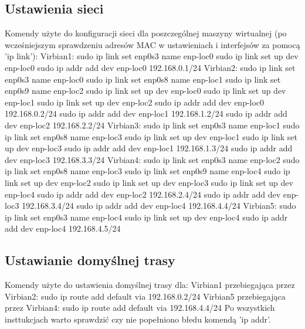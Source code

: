 \documentclass{article}
\begin{document}
\subsection{Ustawienia sieci}
Komendy użyte do konfiguracji sieci dla poszczególnej maszyny wirtualnej (po wcześniejszym sprawdzeniu adresów MAC w ustawieniach i interfejsów za pomocą 'ip link'):
\tabto{0.4cm}Virbian1:
\tabto{0.8cm}    sudo ip link set enp0s3 name enp-loc0
\tabto{0.8cm}    sudo ip link set up dev enp-loc0
\tabto{0.8cm}    sudo ip addr add dev enp-loc0 192.168.0.1/24
\tabto{0.4cm}Virbian2:
\tabto{0.8cm}    sudo ip link set enp0s3 name enp-loc0
\tabto{0.8cm}    sudo ip link set enp0s8 name enp-loc1
\tabto{0.8cm}    sudo ip link set enp0s9 name enp-loc2
\tabto{0.8cm}    sudo ip link set up dev enp-loc0
\tabto{0.8cm}    sudo ip link set up dev enp-loc1
\tabto{0.8cm}    sudo ip link set up dev enp-loc2
\tabto{0.8cm}    sudo ip addr add dev enp-loc0 192.168.0.2/24
\tabto{0.8cm}    sudo ip addr add dev enp-loc1 192.168.1.2/24
\tabto{0.8cm}    sudo ip addr add dev enp-loc2 192.168.2.2/24
\tabto{0.4cm}Virbian3:
\tabto{0.8cm}    sudo ip link set enp0s3 name enp-loc1
\tabto{0.8cm}    sudo ip link set enp0s8 name enp-loc3
\tabto{0.8cm}    sudo ip link set up dev enp-loc1
\tabto{0.8cm}    sudo ip link set up dev enp-loc3
\tabto{0.8cm}    sudo ip addr add dev enp-loc1 192.168.1.3/24
\tabto{0.8cm}    sudo ip addr add dev enp-loc3 192.168.3.3/24
\tabto{0.4cm}Virbian4:
\tabto{0.8cm}    sudo ip link set enp0s3 name enp-loc2
\tabto{0.8cm}    sudo ip link set enp0s8 name enp-loc3
\tabto{0.8cm}    sudo ip link set enp0s9 name enp-loc4
\tabto{0.8cm}    sudo ip link set up dev enp-loc2
\tabto{0.8cm}    sudo ip link set up dev enp-loc3
\tabto{0.8cm}    sudo ip link set up dev enp-loc4
\tabto{0.8cm}    sudo ip addr add dev enp-loc2 192.168.2.4/24
\tabto{0.8cm}    sudo ip addr add dev enp-loc3 192.168.3.4/24
\tabto{0.8cm}    sudo ip addr add dev enp-loc4 192.168.4.4/24
\tabto{0.4cm}Virbian5:
\tabto{0.8cm}    sudo ip link set enp0s3 name enp-loc4
\tabto{0.8cm}    sudo ip link set up dev enp-loc4
\tabto{0.8cm}    sudo ip addr add dev enp-loc4 192.168.4.5/24
\subsection{Ustawianie domyślnej trasy}
Komendy użyte do ustawienia domyślnej trasy dla:
\tabto{0.4cm}Virbian1 przebiegająca przez Virbian2:
\tabto{0.8cm}    sudo ip route add default via 192.168.0.2/24
\tabto{0.4cm}Virbian5 przebiegająca przez Virbian4:
\tabto{0.8cm}    sudo ip route add default via 192.168.4.4/24
Po wszystkich insttukcjach warto sprawdzić czy nie popełniono błedu komendą 'ip addr'.
\end{document}
